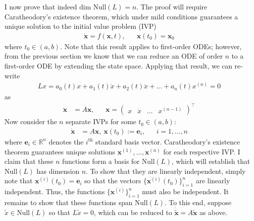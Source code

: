 \documentclass[12pt]{article}
\newcommand{\R}{\mathbb{R}}
\newcommand{\bx}{\mathbf{x}}
\newcommand{\be}{\mathbf{e}}
\begin{document}
I now prove that indeed $\text{dim } \text{Null}(L) = n$. The proof will require Caratheodory's existence theorem, which under mild conditions guarantees a unique solution to the initial value problem (IVP) 
\begin{align*}
\dot{\bx} = f(\bx, t), && \bx(t_0) = \bx_0
\end{align*}
where $t_0 \in (a, b)$. Note that this result applies to first-order ODEs; however, from the previous section we know that we can reduce an ODE of order $n$ to a first-order ODE 
by extending the state space. Applying that result, we can re-write 
\begin{align*}
Lx = a_0(t)x + a_1(t) \dot{x} + a_2(t) \ddot{x} + \dots + a_n(t) x^{(n)} = 0
\end{align*}
as 
\begin{align*}
\dot{\bx} &= A\bx, &&\bx = \begin{pmatrix} x & \dot{x} & \hdots & x^{(n-1)} \end{pmatrix}^\top
\end{align*}
Now consider the $n$ separate IVPs for some $t_0 \in (a, b)$:
\begin{align*}
\dot{\bx} &= A\bx, \ \bx(t_0) := \be_i, &&i = 1, \dots, n
\end{align*}
where $\be_i \in \R^n$ denotes the $i^{\text{th}}$ standard basis vector. Caratheodory's existence theorem guarantees unique solutions 
$\bx^{(1)}, \dots, \bx^{(n)}$ for each respective IVP. I claim that these $n$ functions form a basis for $\text{Null}(L)$, which will establish that $\text{Null}(L)$ has dimension $n$.
To show that they are linearly independent, simply note that $\bx^{(i)}(t_0) = \be_i$ so that the vectors $\{\bx^{(i)}(t_0)\}_{i = 1}^{n}$ are linearly independent. Thus, the functions 
 $\{\bx^{(i)}\}_{i = 1}^{n}$ must also be independent. It remains to show that these functions span $\text{Null}(L)$. To this end, suppose $\tilde{x} \in \text{Null}(L)$ so that $L\tilde{x} = 0$, 
 which can be reduced to $\dot{\tilde{\bx}} = A\tilde{\bx}$ as above. 
 
\end{document}
